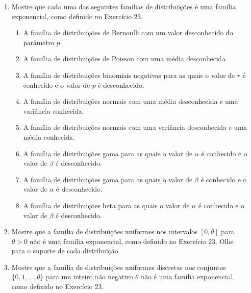 \begin{enumerate}
    \item Mostre que cada uma das seguintes famílias de distribuições é uma família exponencial, como definido no Exercício 23.
    \begin{enumerate}[label=(\alph*)]
        \item A família de distribuições de Bernoulli com um valor desconhecido do parâmetro $p$.
        \item A família de distribuições de Poisson com uma média desconhecida.
        \item A família de distribuições binomiais negativas para as quais o valor de $r$ é conhecido e o valor de $p$ é desconhecido.
        \item A família de distribuições normais com uma média desconhecida e uma variância conhecida.
        \item A família de distribuições normais com uma variância desconhecida e uma média conhecida.
        \item A família de distribuições gama para as quais o valor de $\alpha$ é conhecido e o valor de $\beta$ é desconhecido.
        \item A família de distribuições gama para as quais o valor de $\beta$ é conhecido e o valor de $\alpha$ é desconhecido.
        \item A família de distribuições beta para as quais o valor de $\alpha$ é conhecido e o valor de $\beta$ é desconhecido.
    \end{enumerate}

    \item Mostre que a família de distribuições uniformes nos intervalos $[0, \theta]$ para $\theta>0$ não é uma família exponencial, como definido no Exercício 23. Olhe para o suporte de cada distribuição.
    
    \item Mostre que a família de distribuições uniformes discretas nos conjuntos $\{0, 1, \dots, \theta\}$ para um inteiro não negativo $\theta$ não é uma família exponencial, como definido no Exercício 23.

\end{enumerate}